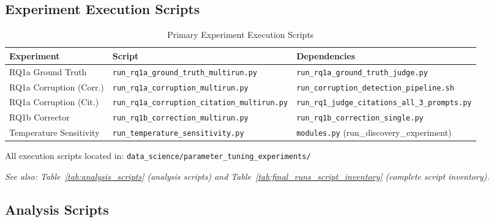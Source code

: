 \subsection{Experiment Execution Scripts}

\begin{table}[H]
\centering
\caption{Primary Experiment Execution Scripts}
\label{tab:exec_scripts}
\footnotesize
\begin{tabularx}{\textwidth}{@{}l X X@{}}
\toprule
\textbf{Experiment} & \textbf{Script} & \textbf{Dependencies} \\
\midrule
RQ1a Ground Truth & \texttt{run\_rq1a\_ground\_truth\_multirun.py} & \texttt{run\_rq1a\_ground\_truth\_judge.py} \\
RQ1a Corruption (Corr.) & \texttt{run\_rq1a\_corruption\_multirun.py} & \texttt{run\_corruption\_detection\_pipeline.sh} \\
RQ1a Corruption (Cit.) & \texttt{run\_rq1a\_corruption\_citation\_multirun.py} & \texttt{run\_rq1\_judge\_citations\_all\_3\_prompts.py} \\
RQ1b Corrector & \texttt{run\_rq1b\_correction\_multirun.py} & \texttt{run\_rq1b\_correction\_single.py} \\
Temperature Sensitivity & \texttt{run\_temperature\_sensitivity.py} & \texttt{modules.py} (run\_discovery\_experiment) \\
\bottomrule
\end{tabularx}
\end{table}

All execution scripts located in: \texttt{data\_science/parameter\_tuning\_experiments/}

\noindent\textit{See also: Table~\ref{tab:analysis_scripts} (analysis scripts) and Table~\ref{tab:final_runs_script_inventory} (complete script inventory).}

\subsection{Analysis Scripts}

